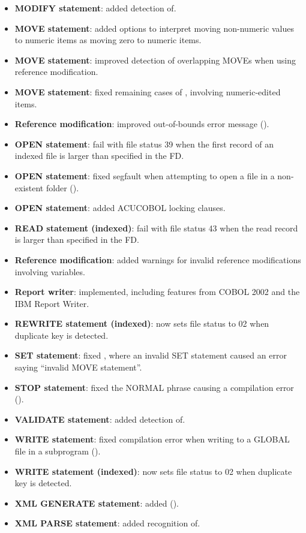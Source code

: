 \begin{itemize}
\item \textbf{MODIFY statement}: added detection of.
\item \textbf{MOVE statement}: added options to interpret moving non-numeric values to numeric items as moving zero to numeric items.
\item \textbf{MOVE statement}: improved detection of overlapping MOVEs when using reference modification.
\item \textbf{MOVE statement}: fixed remaining cases of , involving numeric-edited items.
\item \textbf{Reference modification}: improved out-of-bounds error message ().
\item \textbf{OPEN statement}: fail with file status 39 when the first record of an indexed file is larger than specified in the FD.
\item \textbf{OPEN statement}: fixed segfault when attempting to open a file in a non-existent folder ().
\item \textbf{OPEN statement}: added ACUCOBOL locking clauses.
\item \textbf{READ statement (indexed)}: fail with file status 43 when the read record is larger than specified in the FD.
\item \textbf{Reference modification}: added warnings for invalid reference modifications involving variables.
\item \textbf{Report writer}: implemented, including features from COBOL 2002 and the IBM Report Writer.
\item \textbf{REWRITE statement (indexed)}: now sets file status to 02 when duplicate key is detected.
\item \textbf{SET statement}: fixed , where an invalid SET statement caused an error saying ``invalid MOVE statement''.
\item \textbf{STOP statement}: fixed the NORMAL phrase causing a compilation error ().
\item \textbf{VALIDATE statement}: added detection of.
\item \textbf{WRITE statement}: fixed compilation error when writing to a GLOBAL file in a subprogram ().
\item \textbf{WRITE statement (indexed)}: now sets file status to 02 when duplicate key is detected.
\item \textbf{XML GENERATE statement}: added ().
\item \textbf{XML PARSE statement}: added recognition of.
\end{itemize}

